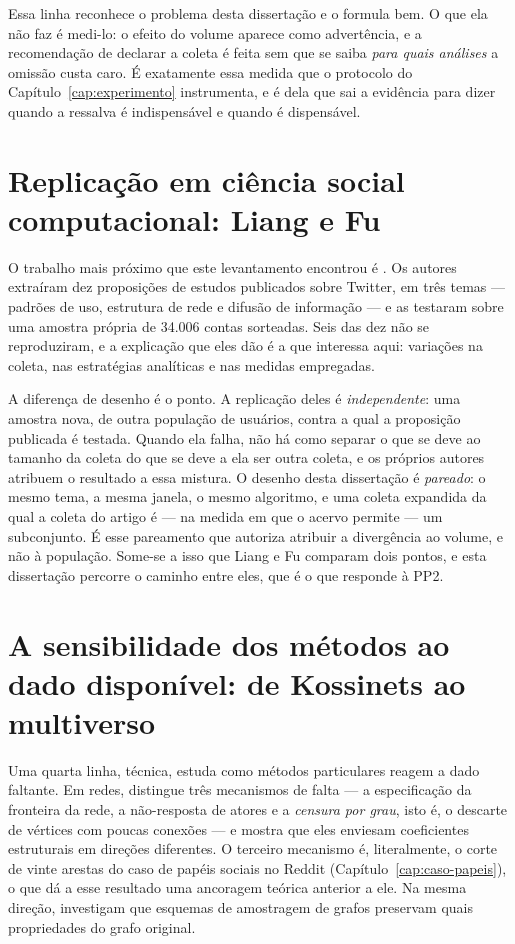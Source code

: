 Essa linha reconhece o problema desta dissertação e o formula bem. O que ela não faz é
medi-lo: o efeito do volume aparece como advertência, e a recomendação de declarar a
coleta é feita sem que se saiba \emph{para quais análises} a omissão custa caro. É
exatamente essa medida que o protocolo do Capítulo~\ref{cap:experimento} instrumenta, e
é dela que sai a evidência para dizer quando a ressalva é indispensável e quando é
dispensável.

\section[Replicação em ciência social computacional: Liang e Fu]{Replicação em
ciência social computacional: Liang e Fu}
\label{sec:rel-replicacao}

O trabalho mais próximo que este levantamento encontrou é
. Os autores extraíram dez proposições de estudos
publicados sobre Twitter, em três temas --- padrões de uso, estrutura de rede e difusão
de informação --- e as testaram sobre uma amostra própria de 34.006 contas sorteadas.
Seis das dez não se reproduziram, e a explicação que eles dão é a que interessa aqui:
variações na coleta, nas estratégias analíticas e nas medidas empregadas.

A diferença de desenho é o ponto. A replicação deles é \emph{independente}: uma amostra
nova, de outra população de usuários, contra a qual a proposição publicada é testada.
Quando ela falha, não há como separar o que se deve ao tamanho da coleta do que se deve
a ela ser outra coleta, e os próprios autores atribuem o resultado a essa mistura. O
desenho desta dissertação é \emph{pareado}: o mesmo tema, a mesma janela, o mesmo
algoritmo, e uma coleta expandida da qual a coleta do artigo é --- na medida em que o
acervo permite --- um subconjunto. É esse pareamento que autoriza atribuir a divergência
ao volume, e não à população. Some-se a isso que Liang e Fu comparam dois pontos, e
esta dissertação percorre o caminho entre eles, que é o que responde à PP2.

\section[A sensibilidade dos métodos: Kossinets]{A sensibilidade dos métodos ao dado disponível: de Kossinets ao
multiverso}
\label{sec:rel-metodos}

Uma quarta linha, técnica, estuda como métodos particulares reagem a dado faltante. Em
redes,  distingue três mecanismos de falta --- a
especificação da fronteira da rede, a não-resposta de atores e a \emph{censura por
grau}, isto é, o descarte de vértices com poucas conexões --- e mostra que eles
enviesam coeficientes estruturais em direções diferentes. O terceiro mecanismo é,
literalmente, o corte de vinte arestas do caso de papéis sociais no Reddit
(Capítulo~\ref{cap:caso-papeis}), o que dá a esse resultado uma ancoragem teórica
anterior a ele. Na mesma direção,  investigam que
esquemas de amostragem de grafos preservam quais propriedades do grafo original.

